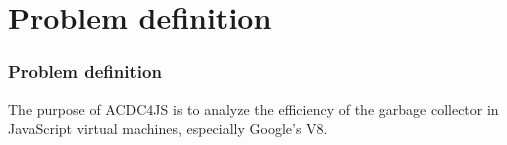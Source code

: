 %
%
\section{Problem definition} 
\begin{frame}
	\frametitle{Problem definition}
	The purpose of ACDC4JS is to analyze the efficiency of the garbage collector in JavaScript virtual machines, especially Google's V8.
\end{frame}